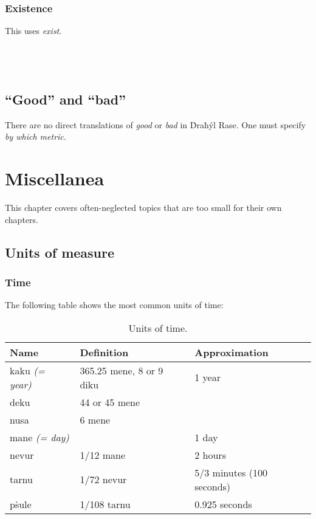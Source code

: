 \documentclass{book}
\begin{document}
\subsection{Existence}

This uses  \emph{exist}. \\
~\\
  \\
  \\
\emph{ }

\section{``Good'' and ``bad''}

There are no direct translations of \emph{good} or \emph{bad} in Ḋraħýl Rase. One must specify \emph{by which metric}.

\chapter{Miscellanea}

This chapter covers often-neglected topics that are too small for their own chapters.

\section{Units of measure}

\subsection{Time}

The following table shows the most common units of time:

\begin{table}[h]
    \caption{Units of time.}
    \centering
    \begin{tabu} to \linewidth {|l|X|X|}
        \hline
        Name & Definition & Approximation \\
        \hline
        kaku \emph{(= year)} & 365.25 mene, 8 or 9 diku & 1 year \\
        deku & 44 or 45 mene & \\
        nusa & 6 mene & \\
        mane \emph{(= day)} & & 1 day \\
        nevur & 1/12 mane & 2 hours \\
        tarnu & 1/72 nevur & 5/3 minutes (100 seconds) \\
        pṡule & 1/108 tarnu & 0.925 seconds \\
        \hline
    \end{tabu}
\end{table}
\end{document}
